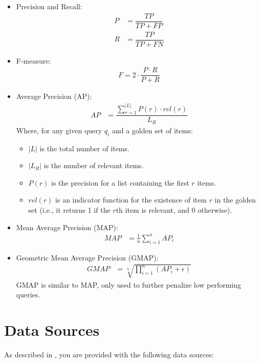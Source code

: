 \begin{itemize}
\item Precision and Recall:
\begin{align}
P &= \dfrac{TP}{TP + FP} \tag{where TP are true positives, and FP are false positives}\\
R &= \dfrac{TP}{TP + FN} \tag{where TP are true positives, and FN are false negatives}
\end{align}
\item F-measure:
\begin{align}
F = 2 \cdot \dfrac{P\cdot R}{P + R} \tag{Harmonic mean of Precision and Recall}
\end{align}
\item Average Precision (AP):
\begin{align}
AP &= \dfrac{\sum^{|L|}_{r=1} P(r) \cdot rel(r)}{L_R} \tag{see below}
\end{align} 
Where, for any given query $q_i$ and a golden set of items:
\begin{itemize}
\item $|L|$ is the total number of items.
\item $|L_R|$ is the number of relevant items. 
\item $P(r)$ is the precision for a list containing the first $r$ items.
\item $rel(r)$ is an indicator function for the existence of item $r$ in the golden set (i.e., it returns 1 if the $r$th item is relevant, and 0 otherwise).
\end{itemize}
\item Mean Average Precision (MAP):
\begin{align}
MAP &= \frac{1}{n} \sum^n_{i=1}AP_i  \tag{To get the average precision for list of queries $q_1, q_2, \dots, q_n$.}
\end{align}
\item Geometric Mean Average Precision (GMAP):
\begin{align}
GMAP &= \sqrt[n]{\prod^n_{i=1}(AP_i + \epsilon)} \tag{with some small $\epsilon$ for cases where $AP_i=0$}
\end{align}
GMAP is similar to MAP, only used to further penalize low performing queries.
\end{itemize}
\section{Data Sources}
\label{sec:DataSources}
As described in \cite{145}, you are provided with the following data sources:
